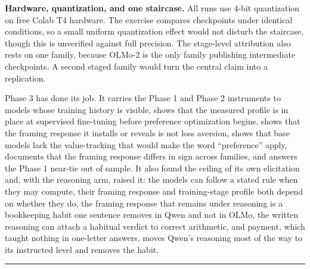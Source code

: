 \documentclass[11pt]{article}
\begin{document}
\textbf{Hardware, quantization, and one staircase.} All runs use 4-bit quantization on free Colab T4
hardware. The exercise compares checkpoints under identical conditions, so a small uniform quantization
effect would not disturb the staircase, though this is unverified against full precision. The
stage-level attribution also rests on one family, because OLMo-2 is the only family publishing
intermediate checkpoints. A second staged family would turn the central claim into a replication.

Phase 3 has done its job. It carries the Phase 1 and Phase 2 instruments to models whose training history
is visible, shows that the measured profile is in place at supervised fine-tuning before preference
optimization begins, shows that the framing response it installs or reveals is not loss aversion,
shows that base models
lack the value-tracking that would make the word ``preference'' apply, documents that the framing response
differs in sign across families, and answers the Phase 1 near-tie out of sample. It also found the ceiling
of its own elicitation and, with the reasoning arm, raised it: the models can follow a stated rule when
they may compute, their framing response and training-stage profile both depend on whether they do, the
framing response that remains under reasoning is a bookkeeping habit one sentence removes in Qwen and
not in OLMo, the
written reasoning can attach a habitual verdict to correct arithmetic, and payment, which taught nothing
in one-letter answers, moves Qwen's reasoning most of the way to its instructed level and removes the
habit.

\vspace{1em}
\hrule
\vspace{0.5em}

\nocite{holt2002,kahneman1979,koszegi2006,prelec1998,train2009,tversky1981,tversky1992,wu1996}
{\small


}
\end{document}
